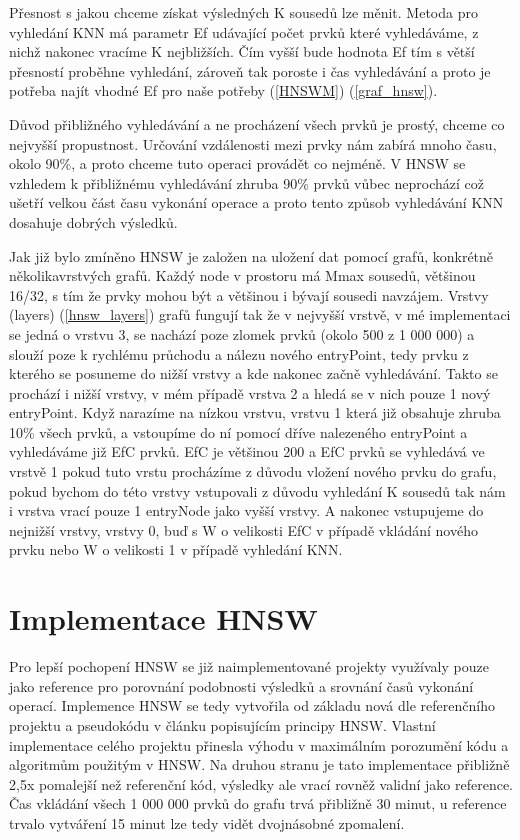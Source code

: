 \documentclass[czech,semestral,dept460,male,csharp,cpdeclaration]{diploma}
\begin{document}
		Přesnost s jakou chceme získat výsledných K sousedů lze měnit. Metoda pro vyhledání KNN má parametr Ef udávající počet prvků které vyhledáváme, z nichž nakonec vracíme K nejbližších. Čím vyšší bude hodnota Ef tím s větší přesností proběhne vyhledání, zároveň tak poroste i čas vyhledávání a proto je potřeba najít vhodné Ef pro naše potřeby (\ref{HNSWM}) (\ref{graf_hnsw}).
		
		Důvod přibližného vyhledávání a ne procházení všech prvků je prostý, chceme co nejvyšší propustnost. Určování vzdálenosti mezi prvky nám zabírá mnoho času, okolo 90\%, a proto chceme tuto operaci provádět co nejméně. V HNSW se vzhledem k přibližnému vyhledávání zhruba 90\% prvků vůbec neprochází což ušetří velkou část času vykonání operace a proto tento způsob vyhledávání KNN dosahuje dobrých výsledků.
		
		Jak již bylo zmíněno HNSW je založen na uložení dat pomocí grafů, konkrétně několikavrstvých grafů. Každý node v prostoru má Mmax sousedů, většinou 16/32, s tím že prvky mohou být a většinou i bývají sousedi navzájem. Vrstvy (layers) (\ref{hnsw_layers}) grafů fungují tak že v nejvyšší vrstvě, v mé implementaci se jedná o vrstvu 3, se nachází poze zlomek prvků (okolo 500 z 1 000 000) a slouží poze k rychlému průchodu a nálezu nového entryPoint, tedy prvku z kterého se posuneme do nižší vrstvy a kde nakonec začně vyhledávání. Takto se prochází i nižší vrstvy, v mém případě vrstva 2 a hledá se v nich pouze 1 nový entryPoint. Když narazíme na nízkou vrstvu, vrstvu 1 která již obsahuje zhruba 10\% všech prvků, a vstoupíme do ní pomocí dříve nalezeného entryPoint a vyhledáváme již EfC prvků. EfC je většinou 200 a EfC prvků se vyhledává ve vrstvě 1 pokud tuto vrstu procházíme z důvodu vložení nového prvku do grafu, pokud bychom do této vrstvy vstupovali z důvodu vyhledání K sousedů tak nám i vrstva vrací pouze 1 entryNode jako vyšší vrstvy. A nakonec vstupujeme do nejnižší vrstvy, vrstvy 0, buď s W o velikosti EfC v případě vkládání nového prvku nebo W o velikosti 1 v případě vyhledání KNN.
		
		\section{Implementace HNSW}
		
		Pro lepší pochopení HNSW se již naimplementované projekty \cite{git-hnswlib} \cite{git-hnsw} využívaly pouze jako reference pro porovnání podobnosti výsledků a srovnání časů vykonání operací. Implemence HNSW se tedy vytvořila od základu nová dle referenčního projektu a pseudokódu v článku popisujícím principy HNSW. Vlastní implementace celého projektu přinesla výhodu v maximálním porozumění kódu a algoritmům použitým v HNSW. Na druhou stranu je tato implementace přibližně 2,5x pomalejší než referenční kód, výsledky ale vrací rovněž validní jako reference. Čas vkládání všech 1 000 000 prvků do grafu trvá přibližně 30 minut, u reference trvalo vytváření 15 minut lze tedy vidět dvojnásobné zpomalení.
		
\end{document}
